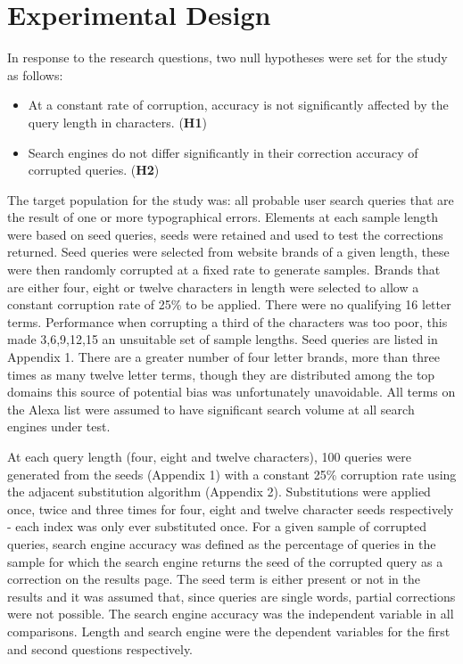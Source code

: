 \documentclass{csfourzero}
\begin{document}
\section{Experimental Design}
\label{sec:exp}

In response to the research questions, two null hypotheses were set for the study as follows:
\begin{itemize}
  \item{At a constant rate of corruption, accuracy is not significantly affected by the query length in characters. (\textbf{H1})}
  \item{Search engines do not differ significantly in their correction accuracy of corrupted queries. (\textbf{H2})}
\end{itemize}

\noindent
The target population for the study was: all probable user search queries that are the result of one or more typographical errors. Elements at each sample length were based on seed queries, seeds were retained and used to test the corrections returned. Seed queries were selected from website brands of a given length, these were then randomly corrupted at a fixed rate to generate samples. Brands that are either four, eight or twelve characters in length were selected to allow a constant corruption rate of 25\% to be applied. There were no qualifying 16 letter terms. Performance when corrupting a third of the characters was too poor, this made 3,6,9,12,15 an unsuitable set of sample lengths. Seed queries are listed in Appendix 1. There are a greater number of four letter brands, more than three times as many twelve letter terms, though they are distributed among the top domains this source of potential bias was unfortunately unavoidable. All terms on the Alexa list were assumed to have significant search volume at all search engines under test.

At each query length (four, eight and twelve characters), 100 queries were generated from the seeds (Appendix 1) with a constant 25\% corruption rate using the adjacent substitution algorithm (Appendix 2). Substitutions were applied once, twice and three times for four, eight and twelve character seeds respectively - each index was only ever substituted once. For a given sample of corrupted queries, search engine accuracy was defined as the percentage of queries in the sample for which the search engine returns the seed of the corrupted query as a correction on the results page. The seed term is either present or not in the results and it was assumed that, since queries are single words, partial corrections were not possible. The search engine accuracy was the independent variable in all comparisons. Length and search engine were the dependent variables for the first and second questions respectively.
\end{document}
